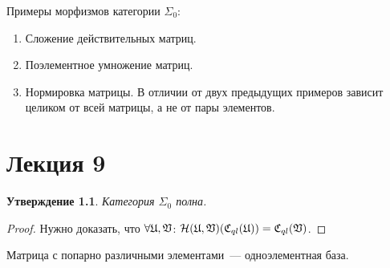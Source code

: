 \documentclass[a4paper, 12pt]{report}
\newtheorem{St}{Утверждение}[chapter]
\begin{document}
Примеры морфизмов категории $\Sigma_0$:
\begin{enumerate}
\item Сложение действительных матриц.
\item Поэлементное умножение матриц.
\item Нормировка матрицы. В отличии от двух предыдущих примеров зависит целиком от всей матрицы, а не от пары элементов.
\end{enumerate}
\chapter{Лекция 9}
\begin{St}
Категория $\Sigma_0$ полна.
\end{St}
\begin{proof}
Нужно доказать, что $\forall \mathfrak{U}, \mathfrak{V}$: $\mathcal{H}(\mathfrak{U}, \mathfrak{V})(\mathfrak{C}_{ql}(\mathfrak{U})) = \mathfrak{C}_{ql}(\mathfrak{V})$.
\end{proof}

Матрица с попарно различными элементами~--- одноэлементная база.
\end{document}
